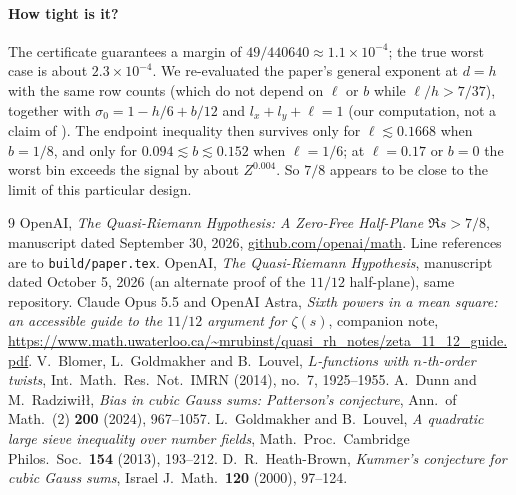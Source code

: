 \documentclass[11pt]{article}
\begin{document}
\paragraph{How tight is it?} The certificate guarantees a margin of $49/440640\approx1.1\times10^{-4}$;
the true worst case is about $2.3\times10^{-4}$. We re-evaluated the paper's general exponent \cite[eq.\ stage-high-exponent]{OAI78} at $d=h$
with the same row counts (which do not depend on $\ell$ or $b$ while $\ell/h>7/37$), together with
$\sigma_0=1-h/6+b/12$ and $l_x+l_y+\ell=1$ (our computation, not a claim of \cite{OAI78}). The
endpoint inequality then survives only for $\ell\lesssim0.1668$ when $b=1/8$, and only for
$0.094\lesssim b\lesssim0.152$ when $\ell=1/6$; at $\ell=0.17$ or $b=0$ the worst bin exceeds the
signal by about $Z^{0.004}$. So $7/8$ appears to be close to the limit of this particular design.

\begin{thebibliography}{9}
 OpenAI, \emph{The Quasi-Riemann Hypothesis: A Zero-Free Half-Plane $\Re s>7/8$},
manuscript dated September 30, 2026,
\href{https://github.com/openai/math/tree/main/preprints/The-Quasi-Riemann-Hypothesis-September-30-2026}{github.com/openai/math}.
Line references are to \texttt{build/paper.tex}.
 OpenAI, \emph{The Quasi-Riemann Hypothesis}, manuscript dated October 5, 2026
(an alternate proof of the $11/12$ half-plane), same repository.
 Claude Opus 5.5 and OpenAI Astra, \emph{Sixth powers in a mean square: an accessible
guide to the $11/12$ argument for $\zeta(s)$}, companion note,
\url{https://www.math.uwaterloo.ca/~mrubinst/quasi_rh_notes/zeta_11_12_guide.pdf}.
 V.~Blomer, L.~Goldmakher and B.~Louvel, \emph{$L$-functions with $n$-th-order twists},
Int.\ Math.\ Res.\ Not.\ IMRN (2014), no.~7, 1925--1955.
 A.~Dunn and M.~Radziwi\l\l, \emph{Bias in cubic Gauss sums: Patterson's conjecture},
Ann.\ of Math.\ (2) \textbf{200} (2024), 967--1057.
 L.~Goldmakher and B.~Louvel, \emph{A quadratic large sieve inequality over number fields},
Math.\ Proc.\ Cambridge Philos.\ Soc.\ \textbf{154} (2013), 193--212.
 D.~R.~Heath-Brown, \emph{Kummer's conjecture for cubic Gauss sums}, Israel J.\ Math.\
\textbf{120} (2000), 97--124.
\end{thebibliography}
\end{document}
